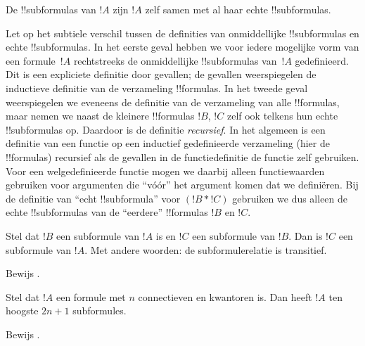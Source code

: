 \documentclass[../../../include/open-logic-section]{subfiles}
\begin{document}
\begin{defn}[!!^{subformula}]
De !!{subformula}s van $!A$ zijn $!A$ zelf samen met al haar echte
!!{subformula}s.
\end{defn}

\begin{explain}
Let op het subtiele verschil tussen de definities van onmiddellijke
!!{subformula}s en echte !!{subformula}s. In het eerste geval hebben
we voor iedere mogelijke vorm van een formule~$!A$ rechtstreeks de
onmiddellijke !!{subformula}s van~$!A$ gedefinieerd. Dit is een
expliciete definitie door gevallen; de gevallen weerspiegelen de
inductieve definitie van de verzameling !!{formula}s. In het tweede
geval weerspiegelen we eveneens de definitie van de verzameling van
alle !!{formula}s, maar nemen we naast de kleinere !!{formula}s $!B$,
$!C$ zelf ook telkens hun echte !!{subformula}s op. Daardoor is de
definitie \emph{recursief}. In het algemeen is een definitie van een
functie op een inductief gedefinieerde verzameling (hier de
!!{formula}s) recursief als de gevallen in de functiedefinitie de
functie zelf gebruiken. Voor een welgedefinieerde functie mogen we
daarbij alleen functiewaarden gebruiken voor argumenten die ``vóór''
het argument komen dat we definiëren. Bij de definitie van ``echt
!!{subformula}'' voor $(!B \ast !C)$ gebruiken we dus alleen de echte
!!{subformula}s van de ``eerdere'' !!{formula}s $!B$ en $!C$.
\end{explain}

\begin{prop}
Stel dat $!B$ een subformule van $!A$ is en $!C$ een subformule van
$!B$. Dan is $!C$ een subformule van $!A$. Met andere woorden: de
subformulerelatie is transitief.
\end{prop}

\begin{prob}
Bewijs .
\end{prob}

\begin{prop}
Stel dat $!A$ een formule met $n$ connectieven en kwantoren is. Dan
heeft $!A$ ten hoogste $2n+1$ subformules.
\end{prop}

\begin{prob}
Bewijs .
\end{prob}
\end{document}
